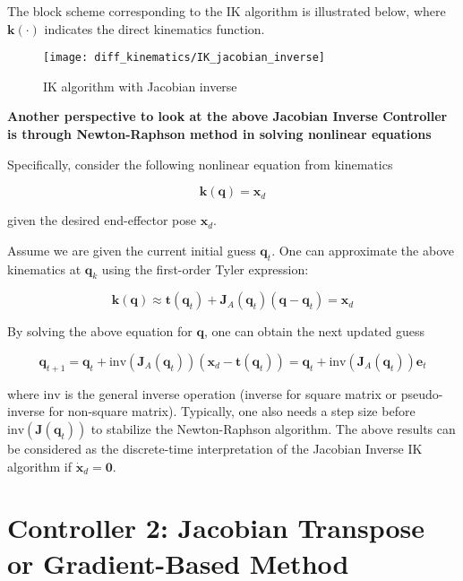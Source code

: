 \documentclass[10pt]{article}
\begin{document}
The block scheme corresponding to the IK algorithm is illustrated below, where $\boldsymbol{k}(\cdot)$ indicates the direct kinematics function. 


\begin{figure}[H]
    \centering
    \texttt{[image: diff\_kinematics/IK\_jacobian\_inverse]}
    \caption{IK algorithm with Jacobian inverse}
    \label{l2-2.fig1}
\end{figure}

\begin{shaded}
\textbf{Another perspective to look at the above Jacobian Inverse Controller is through Newton-Raphson method in solving nonlinear equations}

Specifically, consider the following nonlinear equation from kinematics

$$
\boldsymbol{k}(\boldsymbol{q})=\boldsymbol{x}_d
$$

given the desired end-effector pose $\boldsymbol{x}_d$. 

Assume we are given the current initial guess $\boldsymbol{q}_t$. One can approximate the above kinematics at $\boldsymbol{q}_k$ using the first-order Tyler expression:

$$
\boldsymbol{k}(\boldsymbol{q})\approx\boldsymbol{t}(\boldsymbol{q}_t)+\boldsymbol{J}_{A}(\boldsymbol{q}_t)(\boldsymbol{q}-\boldsymbol{q}_t)=\boldsymbol{x}_d
$$

By solving the above equation for $\boldsymbol{q}$, one can obtain the next updated guess 

$$
\boldsymbol{q}_{t+1}=\boldsymbol{q}_t+\text{inv}\left(\boldsymbol{J}_{A}(\boldsymbol{q}_t)\right)(\boldsymbol{x}_d-\boldsymbol{t}(\boldsymbol{q}_t))=\boldsymbol{q}_t+\text{inv}\left(\boldsymbol{J}_{A}(\boldsymbol{q}_t)\right)\boldsymbol{e}_t
$$

where $\text{inv}$ is the general inverse operation (inverse for square matrix or pseudo-inverse for non-square matrix). Typically, one also needs a step size before $\text{inv}\left(\boldsymbol{J}(\boldsymbol{q}_t)\right)$ to stabilize the Newton-Raphson algorithm.  The above results can be considered as the discrete-time interpretation of the Jacobian Inverse IK algorithm if $\dot{\boldsymbol{x}}_d=\boldsymbol{0}$.
\end{shaded}



\section{Controller 2: Jacobian Transpose or Gradient-Based Method}
\end{document}
